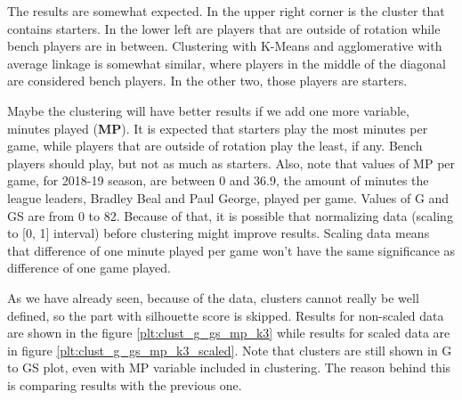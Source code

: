 \documentclass[a4paper]{article}
\begin{document}
The results are somewhat expected. In the upper right corner is the cluster that contains starters. In the lower left are players that are outside of rotation while bench players are in between. Clustering  with K-Means and agglomerative with average linkage is somewhat similar, where players in the middle of the diagonal are considered bench players. In the other two, those players are starters.

Maybe the clustering will have better results if we add one more variable, minutes played (\textbf{MP}). It is expected that starters play the most minutes per game, while players that are outside of rotation play the least, if any. Bench players should play, but not as much as starters. Also, note that values of MP per game, for 2018-19 season, are between 0 and 36.9, the amount of minutes the league leaders, Bradley Beal and Paul George, played per game. Values of G and GS are from 0 to 82. Because of that, it is possible that normalizing data (scaling to [0, 1] interval) before clustering might improve results. Scaling data means that difference of one minute played per game won't have the same significance as difference of one game played.

As we have already seen, because of the data, clusters cannot really be well defined, so the part with silhouette score is skipped. Results for non-scaled data are shown in the figure \ref{plt:clust_g_gs_mp_k3} while results for scaled data are in figure \ref{plt:clust_g_gs_mp_k3_scaled}. Note that clusters are still shown in G to GS plot, even with MP variable included in clustering. The reason behind this is comparing results with the previous one.
\end{document}
